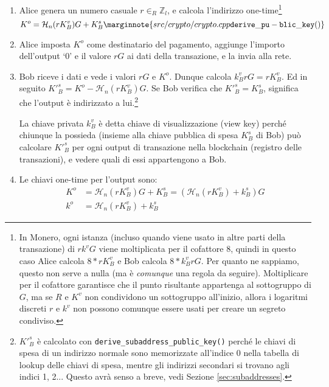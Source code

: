 \begin{enumerate}
    \item Alice genera un numero casuale $r \in_R \mathbb{Z}_l$, e calcola l’indirizzo one-time\footnote{In Monero, ogni istanza (incluso quando viene usato in altre parti della transazione) di $r k^v G$ viene moltiplicata per il cofattore 8, quindi in questo caso Alice calcola $8*r K^v_B$ e Bob calcola $8*k^v_B r G$. Per quanto ne sappiamo, questo non serve a nulla (ma è {\em comunque} una regola da seguire). Moltiplicare per il cofattore garantisce che il punto risultante appartenga al sottogruppo di $G$, ma se $R$ e $K^v$ non condividono un sottogruppo all'inizio, allora i logaritmi discreti $r$ e $k^v$ non possono comunque essere usati per creare un segreto condiviso.}\vspace{.175cm}
	\[K^o  = \mathcal{H}_n(r K_B^v)G + K_B^s\marginnote{src/crypto/ crypto.cpp {\tt derive\_pu- blic\_key()}}\]

    \item Alice imposta $K^o$ come destinatario del pagamento, aggiunge l’importo dell’output ‘0’ e il valore $r G$ ai dati della transazione, e la invia alla rete.

	\item Bob riceve i dati e vede i valori $r G$ e $K^o$. Dunque calcola $k_B^v r G = r K_B^v$. Ed in seguito $K'^s_B = K^o - \mathcal{H}_n(r K_B^v)G$. Se Bob verifica che $K'^s_B = K_B^s$, significa che l’output è indirizzato a lui.\footnote{$K'^s_B$ è calcolato con {\tt derive\_subaddress\_public\_key()} perché le chiavi di spesa di un indirizzo normale sono memorizzate all’indice 0 nella tabella di lookup delle chiavi di spesa, mentre gli indirizzi secondari si trovano agli indici 1, 2... Questo avrà senso a breve, vedi Sezione \ref{sec:subaddresses}.}

	La chiave privata $k_B^v$ è detta chiave di visualizzazione (view key) perché chiunque la possieda (insieme alla chiave pubblica di spesa $K_B^s$ di Bob) può calcolare $K'^s_B$ per ogni output di transazione nella blockchain (registro delle transazioni), e vedere quali di essi appartengono a Bob.

	\item Le chiavi one-time per l’output sono:\vspace{.175cm}
	\begin{align*}
		K^o &= \mathcal{H}_n(r K_B^v)G + K_B^s = (\mathcal{H}_n(r K_B^v) + k_B^s)G  \\ 
		k^o &= \mathcal{H}_n(r K_B^v) + k_B^s
	\end{align*}
\end{enumerate}

